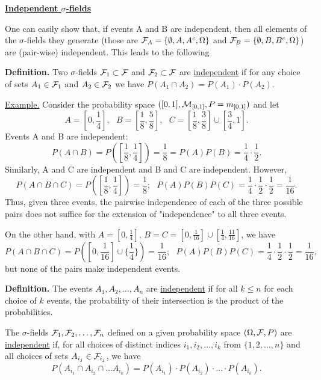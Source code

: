 \documentclass[a4paper,10pt]{article}
\newcommand{\1}[1]{\mathbf{1}_{\{#1\}}}
\begin{document}
\begin{center}\bf\underline{Independent $\sigma$-fields} \end{center}\vspace{3mm}

One can easily show that, if events A and B are independent, then all elements of the $\sigma$-fields they generate (those are ${\cal F}_A=\{\emptyset,A,A^c,\Omega\}$ and ${\cal F}_B=\{\emptyset,B,B^c,\Omega\}$) are (pair-wise) independent. This leads to the following

{\bf Definition.} Two $\sigma$-fields ${\cal F}_1\subset{\cal F}$ and ${\cal F}_2\subset{\cal F}$ are \underline{independent} if   for any choice of sets $A_1\in{\cal F}_1$ and $A_2\in{\cal F}_2$ we have $P(A_1\cap A_2)=P(A_1)\cdot P(A_2)$.\vspace{3mm}

\underline{Example.} Consider the probability space $([0,1],{\cal M}_{[0,1]}, P=m_{[0,1]})$ and let
  $$A=[0,\frac{1}{4}],~~~B=[\frac{1}{8},\frac{5}{8}],~~~C=[\frac{1}{8},\frac{3}{8}]\cup[\frac{3}{4},1].$$
Events  A and B are independent:
  $$P(A\cap B)=P([\frac{1}{8},\frac{1}{4}])=\frac{1}{8}=P(A)P(B)=\frac{1}{4}\cdot\frac{1}{2}.$$
Similarly, A and C are independent and B and C are independent. However,
  $$P(A\cap B\cap C)=P([\frac{1}{8},\frac{1}{4}])=\frac{1}{8};~~~P(A)P(B)P(C)=\frac{1}{4}\cdot\frac{1}{2}\cdot\frac{1}{2}=\frac{1}{16}.$$
Thus, given three events, the pairwise independence of each of the three possible pairs does not suffice for the extension of "independence" to all three events.

On the other hand, with $A=[0,\frac{1}{4}]$, $B=C=[0,\frac{1}{16}]\cup[\frac{1}{4},\frac{11}{16}]$, we have
  $$P(A\cap B\cap C)=P([0,\frac{1}{16}]\cup\{\frac{1}{4}\})=\frac{1}{16};~~~P(A)P(B)P(C)=\frac{1}{4}\cdot\frac{1}{2}\cdot\frac{1}{2}=\frac{1}{16},$$
but none of the pairs make independent events. \vspace{3mm}

{\bf Definition.} The events $A_1,A_2,\ldots, A_n$ are \underline{independent} if for all $k\le n$ for each choice of $k$ events, the probability of their intersection is the product of the probabilities.

The $\sigma$-fields ${\cal F}_1,{\cal F}_2,\ldots,{\cal F}_n$ defined on a given probability space $(\Omega,{\cal F},P)$ are \underline{independent} if, for all choices of distinct indices $i_1,i_2,\ldots,i_k$ from $\{1,2,\ldots,n\}$ and all choices of sets $A_{i_j}\in{\cal F}_{i_j}$, we have
  $$P(A_{i_1}\cap A_{i_2}\cap\ldots A_{i_k})=P(A_{i_1})\cdot P(A_{i_2})\cdot\ldots\cdot P(A_{i_k}).$$\vspace{3mm}
\end{document}
